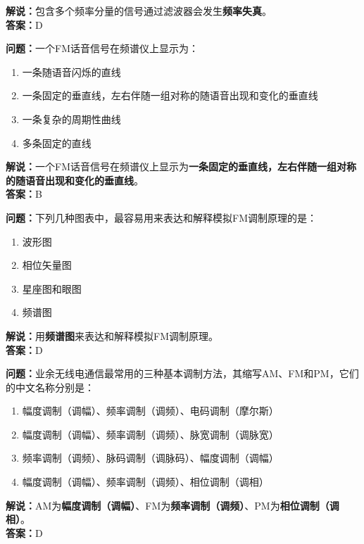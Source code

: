 \textbf{解说：}包含多个频率分量的信号通过滤波器会发生\textbf{频率失真}。\\\textbf{答案：}D%



\textbf{问题：}一个FM话音信号在频谱仪上显示为：

\begin{enumerate}[label=\Alph*), leftmargin=1.5cm]
	\item 一条随语音闪烁的直线
	\item 一条固定的垂直线，左右伴随一组对称的随语音出现和变化的垂直线
	\item 一条复杂的周期性曲线
	\item 多条固定的直线
\end{enumerate}

\textbf{解说：}一个FM话音信号在频谱仪上显示为\textbf{一条固定的垂直线，左右伴随一组对称的随语音出现和变化的垂直线}。\\\textbf{答案：}B%



\textbf{问题：}下列几种图表中，最容易用来表达和解释模拟FM调制原理的是：

\begin{enumerate}[label=\Alph*), leftmargin=1.5cm]
	\item 波形图
	\item 相位矢量图
	\item 星座图和眼图
	\item 频谱图
\end{enumerate}

\textbf{解说：}用\textbf{频谱图}来表达和解释模拟FM调制原理。\\\textbf{答案：}D%



\textbf{问题：}业余无线电通信最常用的三种基本调制方法，其缩写AM、FM和PM，它们的中文名称分别是：

\begin{enumerate}[label=\Alph*), leftmargin=1.5cm]
	\item 幅度调制（调幅）、频率调制（调频）、电码调制（摩尔斯）
	\item 幅度调制（调幅）、频率调制（调频）、脉宽调制（调脉宽）
	\item 频率调制（调频）、脉码调制（调脉码）、幅度调制（调幅）
	\item 幅度调制（调幅）、频率调制（调频）、相位调制（调相）
\end{enumerate}

\textbf{解说：}AM为\textbf{幅度调制（调幅）}、FM为\textbf{频率调制（调频）}、PM为\textbf{相位调制（调相）}。\\\textbf{答案：}D%



